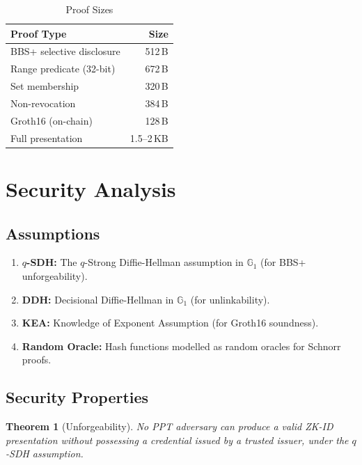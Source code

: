 \documentclass[11pt,a4paper]{article}
\newtheorem{theorem}{Theorem}[section]
\begin{document}
\begin{table}[h]
\centering
\caption{Proof Sizes}
\label{tab:proof-sizes}
\begin{tabular}{@{}lr@{}}
\toprule
\textbf{Proof Type} & \textbf{Size} \\
\midrule
BBS+ selective disclosure  & 512\,B \\
Range predicate (32-bit)   & 672\,B \\
Set membership             & 320\,B \\
Non-revocation             & 384\,B \\
Groth16 (on-chain)         & 128\,B \\
Full presentation          & 1.5--2\,KB \\
\bottomrule
\end{tabular}
\end{table}

\section{Security Analysis}
\label{sec:security}

\subsection{Assumptions}

\begin{enumerate}
    \item \textbf{$q$-SDH:} The $q$-Strong Diffie-Hellman assumption in
    $\mathbb{G}_1$ (for BBS+ unforgeability).
    \item \textbf{DDH:} Decisional Diffie-Hellman in $\mathbb{G}_1$ (for
    unlinkability).
    \item \textbf{KEA:} Knowledge of Exponent Assumption (for Groth16
    soundness).
    \item \textbf{Random Oracle:} Hash functions modelled as random
    oracles for Schnorr proofs.
\end{enumerate}

\subsection{Security Properties}

\begin{theorem}[Unforgeability]
    No PPT adversary can produce a valid ZK-ID presentation without
    possessing a credential issued by a trusted issuer, under the $q$-SDH
    assumption.
\end{theorem}
\end{document}
